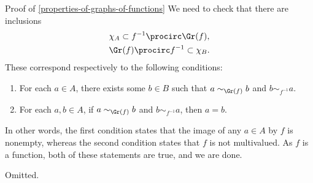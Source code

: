 \begin{Proof}{Proof of \cref{properties-of-graphs-of-functions}}
    We need to check that there are inclusions
    \begin{gather*}
        \chi_{A}              \subset f^{-1}\procirc\Gr(f),\\
        \Gr(f)\procirc f^{-1} \subset \chi_{B}.
    \end{gather*}
    These correspond respectively to the following conditions:
    \begin{enumerate}
        \item\label{proof-of-properties-of-graphs-of-functions-adjointness-inside-sfbfrel-1}For each $a\in A$, there exists some $b\in B$ such that $a\sim_{\Gr(f)}b$ and $b\sim_{f^{-1}}a$.
        \item\label{proof-of-properties-of-graphs-of-functions-adjointness-inside-sfbfrel-2}For each $a,b\in A$, if $a\sim_{\Gr(f)}b$ and $b\sim_{f^{-1}}a$, then $a=b$.
    \end{enumerate}
    In other words, the first condition states that the image of any $a\in A$ by $f$ is nonempty, whereas the second condition states that $f$ is not multivalued. As $f$ is a function, both of these statements are true, and we are done.

    Omitted.


\end{Proof}
